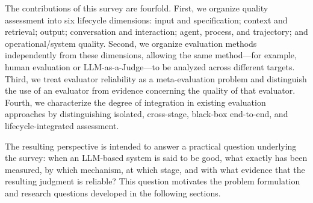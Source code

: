 The contributions of this survey are fourfold. First, we organize quality assessment into six lifecycle dimensions: input and specification; context and retrieval; output; conversation and interaction; agent, process, and trajectory; and operational/system quality. Second, we organize evaluation methods independently from these dimensions, allowing the same method---for example, human evaluation or LLM-as-a-Judge---to be analyzed across different targets. Third, we treat evaluator reliability as a meta-evaluation problem and distinguish the use of an evaluator from evidence concerning the quality of that evaluator. Fourth, we characterize the degree of integration in existing evaluation approaches by distinguishing isolated, cross-stage, black-box end-to-end, and lifecycle-integrated assessment.

The resulting perspective is intended to answer a practical question underlying the survey: when an LLM-based system is said to be good, what exactly has been measured, by which mechanism, at which stage, and with what evidence that the resulting judgment is reliable? This question motivates the problem formulation and research questions developed in the following sections.
